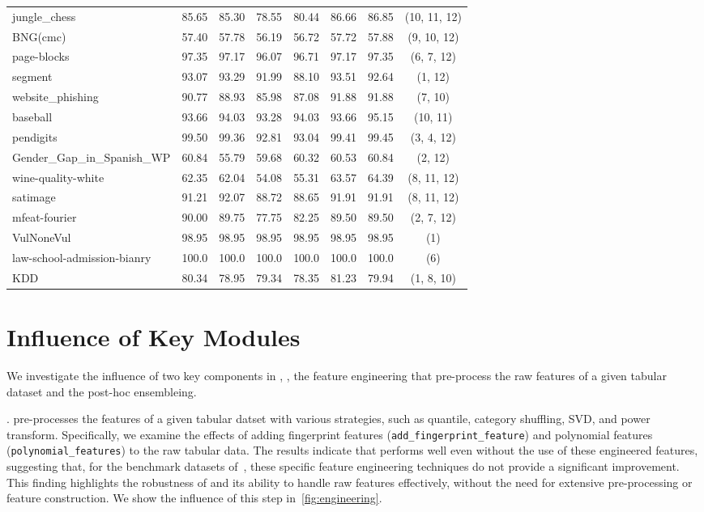 \begin{table}[h]
{\begin{tabular}{lccccccc}
jungle\_chess & 85.65 & 85.30 & 78.55 & 80.44 & 86.66 & 86.85 &(10, 11, 12)\\
BNG(cmc) & 57.40 & 57.78 & 56.19 & 56.72 & 57.72 & 57.88 &(9, 10, 12)\\
page-blocks & 97.35 & 97.17 & 96.07 & 96.71 & 97.17 & 97.35 &(6, 7, 12) \\
segment & 93.07 & 93.29 & 91.99 & 88.10 & 93.51 & 92.64 &(1, 12)\\
website\_phishing & 90.77 & 88.93 & 85.98 & 87.08 & 91.88 & 91.88 &(7, 10) \\
baseball & 93.66 & 94.03 & 93.28 & 94.03 & 93.66 & 95.15 &(10, 11)\\
pendigits & 99.50 & 99.36 & 92.81 & 93.04 & 99.41 & 99.45&(3, 4, 12) \\
Gender\_Gap\_in\_Spanish\_WP & 60.84 & 55.79 & 59.68 & 60.32 & 60.53 & 60.84  &(2, 12)\\
wine-quality-white & 62.35 & 62.04 & 54.08 & 55.31 & 63.57 & 64.39&(8, 11, 12) \\
satimage & 91.21 & 92.07 & 88.72 & 88.65 & 91.91 & 91.91 &(8, 11, 12)\\
mfeat-fourier & 90.00 & 89.75 & 77.75 & 82.25 & 89.50 & 89.50 &(2, 7, 12)\\
VulNoneVul & 98.95 & 98.95 & 98.95 & 98.95 & 98.95 & 98.95 & (1)\\
law-school-admission-bianry & 100.0 & 100.0 & 100.0 & 100.0 & 100.0 & 100.0 &(6)\\
KDD & 80.34 & 78.95 & 79.34 & 78.35 & 81.23 & 79.94 &(1, 8, 10)\\
\bottomrule
\end{tabular}
}
\end{table}


\section{Influence of Key Modules}\label{sec:appendix_ablation}
We investigate the influence of two key components in \ours, \ie, the feature engineering that pre-process the raw features of a given tabular dataset and the post-hoc ensembleing.

. \ours pre-processes the features of a given tabular datset with various strategies, such as quantile, category shuffling, SVD, and power transform. Specifically, we examine the effects of adding fingerprint features (\texttt{add\_fingerprint\_feature}) and polynomial features (\texttt{polynomial\_features}) to the raw tabular data. The results indicate that \ours performs well even without the use of these engineered features, suggesting that, for the benchmark datasets of~\citet{Ye2024Closer}, these specific feature engineering techniques do not provide a significant improvement. This finding highlights the robustness of \ours and its ability to handle raw features effectively, without the need for extensive pre-processing or feature construction. We show the influence of this step in~\autoref{fig:engineering}.

